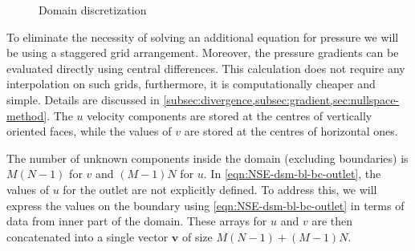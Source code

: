 \documentclass{article}
\begin{document}
\begin{figure}[H] %
  \caption{Domain discretization}\label{bl-domain-discretization}
\end{figure}

To eliminate the necessity of solving an additional equation for pressure we will be using a staggered grid arrangement. 
Moreover, the pressure gradients can be evaluated directly using central differences. 
This calculation does not require any interpolation on such grids, furthermore, it is computationally cheaper and simple. 
Details are discussed in \cref{subsec:divergence,subsec:gradient,sec:nullspace-method}. 
The $u$ velocity components are stored at the centres of vertically oriented faces, while the values of $v$ are stored at the centres of horizontal ones. 

The number of unknown components inside the domain (excluding boundaries) is $M(N-1)$ for $v$ and $(M-1)N$ for $u$. In \cref{eqn:NSE-dsm-bl-bc-outlet}, the values of $u$ for the outlet are not explicitly defined. To address this, we will express the values on the boundary using \cref{eqn:NSE-dsm-bl-bc-outlet} in terms of data from inner part of the domain. These arrays for $u$ and $v$ are then concatenated into a single vector $\boldsymbol{v}$ of size $M(N-1)+(M-1)N$.
\end{document}
